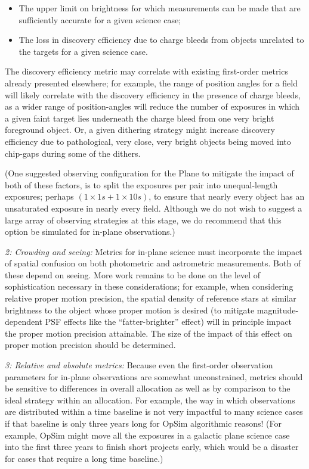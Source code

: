 \begin{itemize}
  \item The upper limit on brightness for which measurements can be made that are sufficiently accurate for a given science case;
  \item The loss in discovery efficiency due to charge bleeds from objects unrelated to the targets for a given science case.
\end{itemize}

The discovery efficiency metric may correlate with existing
first-order metrics already presented elsewhere; for example, the
range of position angles for a field will likely correlate with the
discovery efficiency in the presence of charge bleeds, as a wider
range of position-angles will reduce the number of exposures in which
a given faint target lies underneath the charge bleed from one very
bright foreground object. Or, a given dithering strategy might
increase discovery efficiency due to pathological, very close, very
bright objects being moved into chip-gaps during some of the dithers.

(One suggested observing configuration for the Plane to mitigate the
impact of both of these factors, is to split the exposures per pair
into unequal-length exposures; perhaps $(1 \times 1s + 1\times 10s)$,
to ensure that nearly every object has an unsaturated exposure in
nearly every field. Although we do not wish to suggest a large array
of observing strategies at this stage, we do recommend that this
option be simulated for in-plane observations.)

{\it 2: Crowding and seeing:} Metrics for in-plane science must
incorporate the impact of spatial confusion on both photometric and
astrometric measurements. Both of these depend on seeing. More work
remains to be done on the level of sophistication necessary in these
considerations; for example, when considering relative proper motion
precision, the spatial density of reference stars at similar
brightness to the object whose proper motion is desired (to mitigate
magnitude-dependent PSF effects like the ``fatter-brighter'' effect)
will in principle impact the proper motion precision attainable. The
size of the impact of this effect on proper motion precision should be
determined.

{\it 3: Relative and absolute metrics:} Because even the first-order
observation parameters for in-plane observations are somewhat
unconstrained, metrics should be sensitive to differences in overall
allocation as well as by comparison to the ideal strategy within an
allocation. For example, the way in which observations are distributed
within a time baseline is not very impactful to many science cases if
that baseline is only three years long for OpSim algorithmic reasons!
(For example, OpSim might move all the exposures in a galactic plane
science case into the first three years to finish short projects
early, which would be a disaster for cases that require a long time
baseline.)

